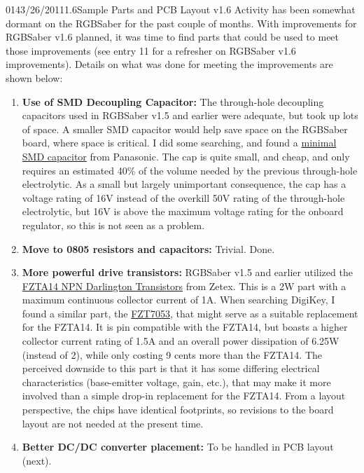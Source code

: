 \documentclass[12pt,letterpaper,onecolumn]{article}
\begin{document}
\begin{nbentry}{014}{3/26/2011}{1.6}{Sample Parts and PCB Layout v1.6}
\indent Activity has been somewhat dormant on the RGBSaber for the past couple of months. With improvements for RGBSaber v1.6 planned, it was time to find parts that could be used to meet those improvements (see entry 11 for a refresher on RGBSaber v1.6 improvements). Details on what was done for meeting the improvements are shown below:
\begin{enumerate}
\item \textbf{Use of SMD Decoupling Capacitor:} The through-hole decoupling capacitors used in RGBSaber v1.5 and earlier were adequate, but took up lots of space. A smaller SMD capacitor would help save space on the RGBSaber board, where space is critical. I did some searching, and found a \href{http://search.digikey.com/scripts/DkSearch/dksus.dll?Detail\&name=PCE4533CT-ND}{minimal SMD capacitor} from Panasonic. The cap is quite small, and cheap, and only requires an estimated 40\% of the volume needed by the previous through-hole electrolytic. As a small but largely unimportant consequence, the cap has a voltage rating of 16V instead of the overkill 50V rating of the through-hole electrolytic, but 16V is above the maximum voltage rating for the onboard regulator, so this is not seen as a problem. 
\item \textbf{Move to 0805 resistors and capacitors:} Trivial. Done.
\item \textbf{More powerful drive transistors:} RGBSaber v1.5 and earlier utilized the \href{http://search.digikey.com/scripts/DkSearch/dksus.dll?Detail\&name=FZTA14CT-ND}{FZTA14 NPN Darlington Transistors} from Zetex. This is a 2W part with a maximum continuous collector current of 1A. When searching DigiKey, I found a similar part, the \href{http://search.digikey.com/scripts/DkSearch/dksus.dll?Detail\&name=FZT7053TACT-ND}{FZT7053}, that might serve as a suitable replacement for the FZTA14. It is pin compatible with the FZTA14, but boasts a higher collector current rating of 1.5A and an overall power dissipation of 6.25W (instead of 2), while only costing 9 cents more than the FZTA14. The perceived downside to this part is that it has some differing electrical characteristics (base-emitter voltage, gain, etc.), that may make it more involved than a simple drop-in replacement for the FZTA14. From a layout perspective, the chips have identical footprints, so revisions to the board layout are not needed at the present time.
\item \textbf{Better DC/DC converter placement:} To be handled in PCB layout (next).

\end{enumerate}
\end{nbentry}
\end{document}
